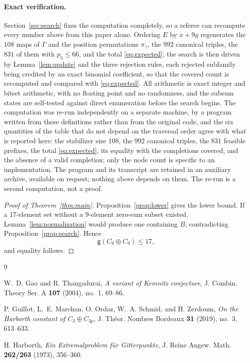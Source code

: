 \documentclass[11pt]{amsart}
\begin{document}
\paragraph{Exact verification.}
Section~\ref{sec:search} fixes the computation completely, so a referee can
recompute every number above from this paper alone. Ordering $E$ by $x+9y$
regenerates the $108$ maps of $\Gamma$ and the position permutations
$\pi_\gamma$, the $992$ canonical triples, the $831$ of them with
$p_3\leq66$, and the total \eqref{eq:expected}; the search is then driven by
Lemma~\ref{lem:update} and the three rejection rules, each rejected
subfamily being credited by an exact binomial coefficient, so that the
covered count is recomputed and compared with \eqref{eq:expected}. All
arithmetic is exact integer and bitset arithmetic, with no floating point
and no randomness, and the subsum states are self-tested against direct
enumeration before the search begins. The computation was re-run
independently on a separate machine, by a program written from these
definitions rather than from the original code, and the six quantities of
the table that do not depend on the traversal order agree with what is
reported here: the stabilizer size $108$, the $992$ canonical triples, the
$831$ feasible prefixes, the total \eqref{eq:expected}, its equality with
the completions covered, and the absence of a valid completion; only the
node count is specific to an implementation. The program and its transcript
are retained in an auxiliary archive, available on request; nothing above
depends on them. The re-run is a second computation, not a proof.

\begin{proof}[Proof of Theorem~\ref{thm:main}]
Proposition~\ref{prop:lower} gives the lower bound. If a $17$-element set
without a $9$-element zero-sum subset existed,
Lemma~\ref{lem:normalization} would produce one containing $B$,
contradicting Proposition~\ref{prop:search}. Hence
\[
  \mathsf g(C_9\oplus C_9)\leq17,
\]
and equality follows.
\end{proof}

\begin{thebibliography}{9}

W.~D. Gao and R. Thangadurai,
\emph{A variant of Kemnitz conjecture},
J. Combin. Theory Ser. A \textbf{107} (2004), no.~1, 69--86.

P. Guillot, L.~E. Marchan, O. Ordaz, W.~A. Schmid, and H. Zerdoum,
\emph{On the Harborth constant of $C_3\oplus C_{3p}$},
J. Th\'eor. Nombres Bordeaux \textbf{31} (2019), no.~3, 613--633.

H. Harborth,
\emph{Ein Extremalproblem f\"ur Gitterpunkte},
J. Reine Angew. Math. \textbf{262/263} (1973), 356--360.

\end{thebibliography}
\end{document}
